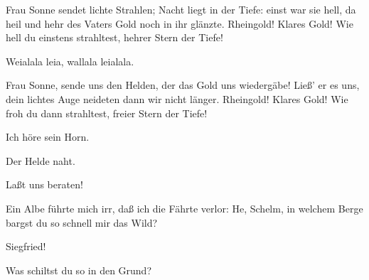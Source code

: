 \begin{drama}
\act
 
\scene







Frau Sonne sendet lichte Strahlen;
Nacht liegt in der Tiefe:
einst war sie hell,
da heil und hehr
des Vaters Gold noch in ihr glänzte.
Rheingold! Klares Gold!
Wie hell du einstens strahltest,
hehrer Stern der Tiefe!


Weialala leia, wallala leialala.


Frau Sonne, sende uns den Helden,
der das Gold uns wiedergäbe!
Ließ' er es uns, dein lichtes Auge
neideten dann wir nicht länger.
Rheingold! Klares Gold!
Wie froh du dann strahltest,
freier Stern der Tiefe!



\Woglindespeaks

Ich höre sein Horn.
 

\Wellgundespeaks

Der Helde naht.
 

\Flosshildespeaks

Laßt uns beraten!
 






\Siegfriedspeaks

Ein Albe führte mich irr,
daß ich die Fährte verlor:
He, Schelm, in welchem Berge
bargst du so schnell mir das Wild?
 



Siegfried!
 

\Flosshildespeaks

Was schiltst du so in den Grund?
 


\end{drama}
